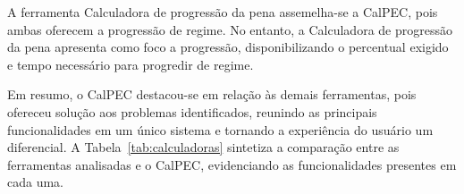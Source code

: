 A ferramenta Calculadora de progressão da pena assemelha-se a CalPEC, pois ambas oferecem a progressão de regime. No entanto, a Calculadora de progressão da pena apresenta como foco a progressão, disponibilizando o percentual exigido e tempo necessário para progredir de regime. 

Em resumo, o CalPEC destacou-se em relação às demais ferramentas, pois ofereceu solução aos problemas identificados, reunindo as principais funcionalidades em um único sistema e tornando a experiência do usuário um diferencial. A Tabela~\ref{tab:calculadoras} sintetiza a comparação entre as ferramentas analisadas e o CalPEC, evidenciando as funcionalidades presentes em cada uma.

\clearpage
\begin{table}[h]
\centering
\caption{Trabalhos relacionados e suas funcionalidades}
\label{tab:calculadoras}
\end{table}